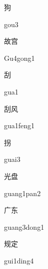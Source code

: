 \begin{verbete}[gou3]{狗}
\begin{pronuncia}{gou3}
\end{pronuncia}
\end{verbete}

\begin{verbete}[Gu4gong1]{故宫}
\begin{pronuncia}{Gu4gong1}
\end{pronuncia}
\end{verbete}

\begin{verbete}[gua1]{刮}
\begin{pronuncia}{gua1}
\end{pronuncia}
\end{verbete}

\begin{verbete}{刮风}
\begin{pronuncia}{gua1feng1}
\end{pronuncia}
\end{verbete}

\begin{verbete}[guai3]{拐}
\begin{pronuncia}{guai3}
\end{pronuncia}
\end{verbete}

\begin{verbete}{光盘}
\begin{pronuncia}{guang1pan2}
\end{pronuncia}
\end{verbete}

\begin{verbete}{广东}
\begin{pronuncia}{guang3dong1}
\end{pronuncia}
\end{verbete}

\begin{verbete}{规定}
\begin{pronuncia}{gui1ding4}
\end{pronuncia}
\end{verbete}

